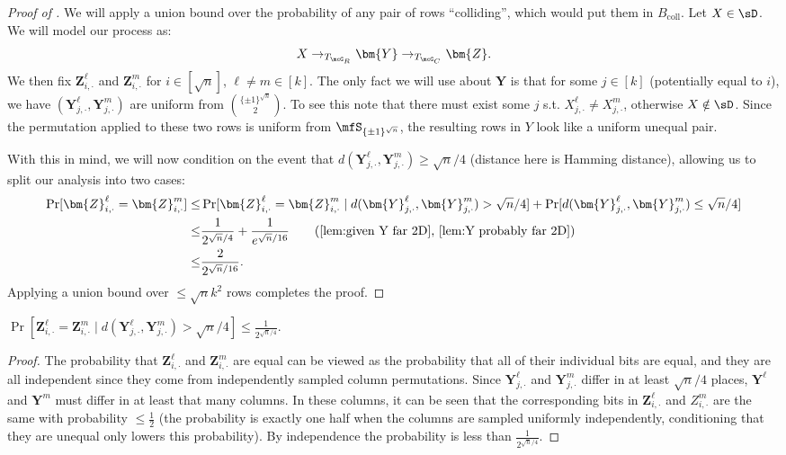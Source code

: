 \begin{proof}[Proof of ]
We will apply a union bound over the probability of any pair of rows ``colliding'', which would put them in $B_{\mathrm{coll}}$. Let $X \in \sD$. We will model our process as:
\begin{equation*}
    X \to_{T_{\mcG_R}} \bm{Y} \to_{T_{\mcG_C}} \bm{Z}.
\end{equation*}
We then fix $\bm{Z}^\ell_{i, \cdot}$ and $\bm{Z}^m_{i, \cdot}$ for $i \in [\sqrt{n}]$, $\ell \neq m \in [k]$. The only fact we will use about $\bm{Y}$ is that for some $j \in [k]$ (potentially equal to $i$), we have $(\bm{Y}^\ell_{j, \cdot}, \bm{Y}^m_{j, \cdot})$ are uniform from ${\{\pm1\}^{\sqrt{n}} \choose 2}$. To see this note that there must exist some $j$ s.t. $X^\ell_{j, \cdot} \neq X^m_{j,\cdot}$, otherwise $X \notin \sD$. Since the permutation applied to these two rows is uniform from $\mfS_{\{\pm1\}^{\sqrt{n}}}$, the resulting rows in $Y$ look like a uniform unequal pair.

With this in mind, we will now condition on the event that $d(\bm{Y}^\ell_{j, \cdot}, \bm{Y}^m_{j, \cdot}) \geq \sqrt{n}/4$ (distance here is Hamming distance), allowing us to split our analysis into two cases:
\begin{align*}
    \Pr[\bm{Z}^\ell_{i, \cdot} = \bm{Z}_{i, \cdot}^m]  \leq&\Pr[\bm{Z}^\ell_{i, \cdot} = \bm{Z}^m_{i, \cdot} \mid d(\bm{Y}^\ell_{j, \cdot}, \bm{Y}^m_{j, \cdot}) > \sqrt{n}/4] + \Pr[d(\bm{Y}^\ell_{j, \cdot}, \bm{Y}^m_{j, \cdot}) \leq \sqrt{n}/4]\\
    \leq&\frac1{2^{\sqrt{n}/4}}+\frac1{e^{\sqrt{n}/16}}\tag{\Cref{lem:given Y far 2D}, \Cref{lem:Y probably far 2D}}\\
    \leq& \frac2{2^{\sqrt{n}/16}}.
\end{align*}
Applying a union bound over $\leq \sqrt{n}k^2$ rows completes the proof.
\end{proof}


\begin{lemma}\label{lem:given Y far 2D}
    $\Pr[\bm{Z}^\ell_{i, \cdot} = \bm{Z}^m_{i, \cdot} \mid d(\bm{Y}^\ell_{j, \cdot}, \bm{Y}^m_{j, \cdot}) > \sqrt{n}/4] \leq \frac{1}{2^{\sqrt{n}/4}}$.
\end{lemma}
\begin{proof}
The probability that $\bm{Z}^\ell_{i, \cdot}$ and $\bm{Z}^m_{i, \cdot}$ are equal can be viewed as the probability that all of their individual bits are equal, and they are all independent since they come from independently sampled column permutations. Since $\bm{Y}^\ell_{j, \cdot}$ and $\bm{Y}^m_{j, \cdot}$ differ in at least $\sqrt{n}/4$ places, $\bm{Y}^\ell$ and $\bm{Y}^m$ must differ in at least that many columns. In these columns, it can be seen that the corresponding bits in $\bm{Z}^\ell_{i, \cdot}$ and $Z^m_{i, \cdot}$ are the same with probability $\leq \frac{1}{2}$ (the probability is exactly one half when the columns are sampled uniformly independently, conditioning that they are unequal only lowers this probability). By independence the probability is less than $\frac{1}{2^{\sqrt{n}/4}}$. \end{proof}

